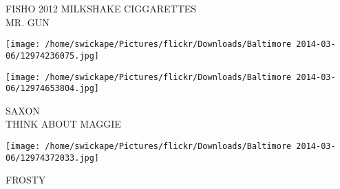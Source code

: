 \documentclass[10pt,letterpaper]{article}
\begin{document}
FISHO 2012 MILKSHAKE CIGGARETTES\\
MR. GUN
\pagebreak

\texttt{[image: /home/swickape/Pictures/flickr/Downloads/Baltimore 2014-03-06/12974236075.jpg]}

\vspace{0.25in}
\texttt{[image: /home/swickape/Pictures/flickr/Downloads/Baltimore 2014-03-06/12974653804.jpg]}

SAXON\\
THINK ABOUT MAGGIE
\pagebreak

\texttt{[image: /home/swickape/Pictures/flickr/Downloads/Baltimore 2014-03-06/12974372033.jpg]}

FROSTY
\pagebreak
\end{document}
